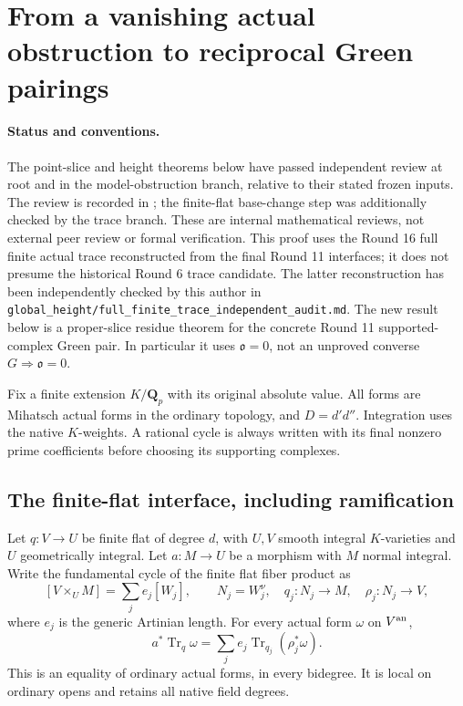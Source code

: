 \section{From a vanishing actual obstruction to reciprocal Green pairings}
\label{r16h:section}

\paragraph{Status and conventions.}
The point-slice and height theorems below have passed independent review
at root and in the model-obstruction branch, relative to their stated
frozen inputs. The review is recorded in
; the
finite-flat base-change step was additionally checked by the trace
branch. These are internal mathematical reviews, not external peer
review or formal verification. This proof uses the Round 16
full finite actual trace reconstructed from the final Round 11 interfaces;
it does not presume the historical Round 6 trace candidate. The latter
reconstruction has been independently checked by this author in
\texttt{global\_height/full\_finite\_trace\_independent\_audit.md}.
The new result below is a proper-slice residue theorem for the concrete
Round 11 supported-complex Green pair. In particular it uses
$\mathfrak o=0$, not an unproved converse $G\Rightarrow\mathfrak o=0$.

Fix a finite extension $K/\mathbf Q_p$ with its original absolute value.
All forms are Mihatsch actual forms in the ordinary topology, and
$D=d'd''$. Integration uses the native $K$-weights. A rational cycle is
always written with its final nonzero prime coefficients before choosing
its supporting complexes.

\subsection{The finite-flat interface, including ramification}

\begin{lemma}
\label{r16h:finite-base-change}
Let $q:V\to U$ be finite flat of degree $d$, with $U,V$ smooth integral
$K$-varieties and $U$ geometrically integral. Let $a:M\to U$ be a
morphism with $M$ normal integral. Write the fundamental cycle of the
finite flat fiber product as
\[
 [V\times_U M]=\sum_j e_j[W_j],
 \qquad N_j=W_j^\nu,\quad q_j:N_j\to M,\quad \rho_j:N_j\to V,
\]
where $e_j$ is the generic Artinian length. For every actual form $\omega$
on $V^{\rm an}$,
\[
 a^*\operatorname{Tr}_q\omega
   =\sum_j e_j\operatorname{Tr}_{q_j}(\rho_j^*\omega).
 \tag{H16.1}\label{r16h:base-change}
\]
This is an equality of ordinary actual forms, in every bidegree. It is
local on ordinary opens and retains all native field degrees.
\end{lemma}

